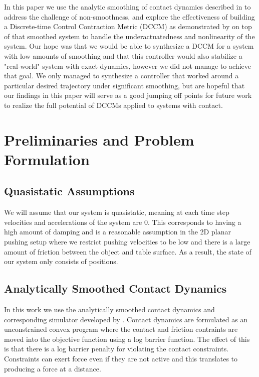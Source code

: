\documentclass[journal]{IEEEtran}
\begin{document}
In this paper we use the analytic smoothing of contact dynamics described in \autocite{pangGlobalPlanningContactRich2023} to address the challenge of non-smoothness, and explore the effectiveness of building a Discrete-time Control Contraction Metric (DCCM) as demonstrated by \autocite{weiControlContractionMetric2021} on top of that smoothed system to handle the underactuatedness and nonlinearity of the system. Our hope was that we would be able to synthesize a DCCM for a system with low amounts of smoothing and that this controller would also stabilize a "real-world" system with exact dynamics, however we did not manage to achieve that goal. We only managed to synthesize a controller that worked around a particular desired trajectory under significant smoothing, but are hopeful that our findings in this paper will serve as a good jumping off points for future work to realize the full potential of DCCMs applied to systems with contact.

\section{Preliminaries and Problem Formulation}
\subsection{Quasistatic Assumptions}
We will assume that our system is quasistatic, meaning at each time step velocities and accelerations of the system are 0. This corresponds to having a high amount of damping and is a reasonable assumption in the 2D planar pushing setup where we restrict pushing velocities to be low and there is a large amount of friction between the object and table surface. As a result, the state of our system only consists of positions.

\subsection{Analytically Smoothed Contact Dynamics}
In this work we use the analytically smoothed contact dynamics and corresponding simulator developed by \autocite{pangGlobalPlanningContactRich2023}. Contact dynamics are formulated as an unconstrained convex program where the contact and friction contraints are moved into the objective function using a log barrier function. The effect of this is that there is a log barrier penalty for violating the contact constraints. Constraints can exert force even if they are not active and this translates to producing a force at a distance.
\end{document}
